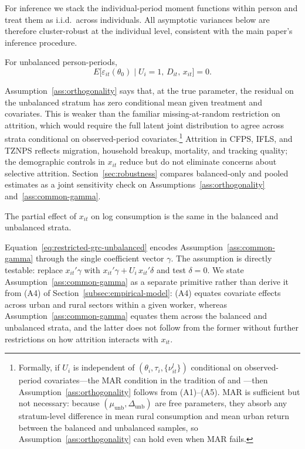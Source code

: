 For inference we stack the individual-period moment functions within person and treat them as i.i.d.\ across individuals.
All asymptotic variances below are therefore cluster-robust at the individual level, consistent with the main paper's inference procedure.

\begin{assumption}
\label{ass:orthogonality}
For unbalanced person-periods,
\[
E\big[\varepsilon_{it}(\theta_0)\mid U_i=1,\,D_{it},\,x_{it}\big]=0.
\]
\end{assumption}

Assumption~\ref{ass:orthogonality} says that, at the true parameter, the residual on the unbalanced stratum has zero conditional mean given treatment and covariates.
This is weaker than the familiar missing-at-random restriction on attrition, which would require the full latent joint distribution to agree across strata conditional on observed-period covariates.\footnote{Formally, if $U_i$ is independent of $(\theta_i,\tau_i,\{\nu_{it}^l\})$ conditional on observed-period covariates---the MAR condition in the tradition of \citet{rubin1976inference} and \citet[ch.~17--19]{wooldridge2010econometric}---then Assumption~\ref{ass:orthogonality} follows from (A1)--(A5). MAR is sufficient but not necessary: because $(\mu_{\mathrm{unb}},\Delta_{\mathrm{unb}})$ are free parameters, they absorb any stratum-level difference in mean rural consumption and mean urban return between the balanced and unbalanced samples, so Assumption~\ref{ass:orthogonality} can hold even when MAR fails.}
Attrition in CFPS, IFLS, and TZNPS reflects migration, household breakup, mortality, and tracking quality; the demographic controls in $x_{it}$ reduce but do not eliminate concerns about selective attrition.
Section~\ref{sec:robustness} compares balanced-only and pooled estimates as a joint sensitivity check on Assumptions~\ref{ass:orthogonality} and~\ref{ass:common-gamma}.

\begin{assumption}
\label{ass:common-gamma}
The partial effect of $x_{it}$ on log consumption is the same in the balanced and unbalanced strata.
\end{assumption}

Equation~\eqref{eq:restricted-grc-unbalanced} encodes Assumption~\ref{ass:common-gamma} through the single coefficient vector $\gamma$.
The assumption is directly testable: replace $x_{it}'\gamma$ with $x_{it}'\gamma + U_i\,x_{it}'\delta$ and test $\delta=0$.
We state Assumption~\ref{ass:common-gamma} as a separate primitive rather than derive it from (A4) of Section~\ref{subsec:empirical-model}: (A4) equates covariate effects across urban and rural sectors within a given worker, whereas Assumption~\ref{ass:common-gamma} equates them across the balanced and unbalanced strata, and the latter does not follow from the former without further restrictions on how attrition interacts with $x_{it}$.

